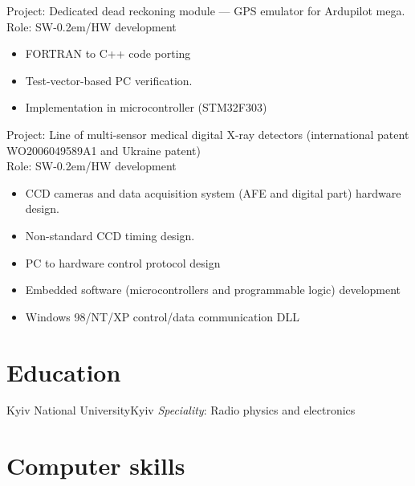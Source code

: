 \documentclass[11pt,a4paper]{moderncv}
\begin{document}
  {Project: Dedicated dead reckoning module — GPS emulator for Ardupilot mega.\\
    Role: SW\kern-0.2em/HW development
    \begin{itemize}
      \item FORTRAN to C++ code porting
      \item Test-vector-based PC verification.
      \item Implementation in microcontroller (STM32F303)
    \end{itemize}}

  {Project: Line of multi-sensor medical digital X-ray detectors (international patent
WO2006049589A1 and Ukraine patent)\\
    Role: SW\kern-0.2em/HW development
    \begin{itemize}
      \item CCD cameras and data acquisition system (AFE and digital part) hardware design.
      \item Non-standard CCD timing design.
      \item PC to hardware control protocol design
      \item Embedded software (microcontrollers and programmable logic) development
      \item Windows 98/NT/XP control/data communication DLL
    \end{itemize}}


\section{Education}
  {Kyiv National University}{Kyiv}{}
  {\textit{Speciality}: Radio physics and electronics}

\section{Computer skills}
\end{document}

